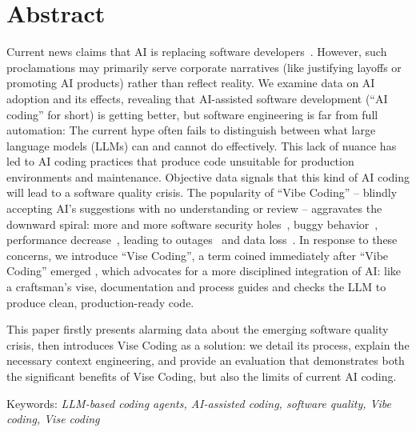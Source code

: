 \documentclass[twocolumn]{article}
\begin{document}
\setlength{\belowcaptionskip}{-10pt}

\section*{Abstract}
Current news claims that AI is replacing software developers~\cite{RJ25,KT25,ET25}.
However, such proclamations may primarily serve corporate narratives (like justifying layoffs or promoting AI products) rather than reflect reality.
We examine data on AI adoption and its effects, revealing that AI-assisted software development (``AI coding'' for short) is getting better,
but software engineering is far from full automation: 
The current hype often fails to distinguish between what large language models (LLMs) can and cannot do effectively.
This lack of nuance has led to AI coding practices that produce code unsuitable for production environments and maintenance.
Objective data signals that this kind of AI coding will lead to a software quality crisis.
The popularity of ``Vibe Coding'' -- blindly accepting AI's suggestions with no understanding or review -- aggravates the downward spiral:
more and more software security holes~\cite{HP25,CW25}, buggy behavior~\cite{Liu24}, performance decrease~\cite{SL24},
leading to outages~\cite{FJ24} and data loss~\cite{BN25}.
In response to these concerns, we introduce ``Vise Coding'', a term coined immediately after ``Vibe Coding'' emerged \cite{DF25},
which advocates for a more disciplined integration of AI:
like a craftsman's vise, documentation and process guides and checks the LLM to produce clean, production-ready code.

This paper firstly presents alarming data about the emerging software quality crisis,
then introduces Vise Coding as a solution: we detail its process, explain the necessary context engineering,
and provide an evaluation that demonstrates both the significant benefits of Vise Coding,
but also the limits of current AI coding.

Keywords: {\em LLM-based coding agents, AI-assisted coding, software quality, Vibe coding, Vise coding}
\end{document}
